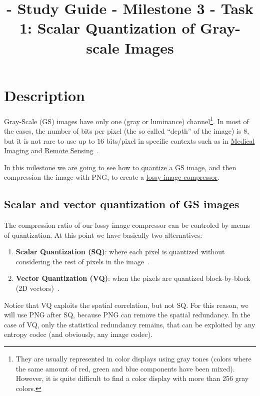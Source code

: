 

\title{\SM{} - Study Guide - Milestone 3 - Task 1: Scalar Quantization of Gray-scale Images}

\maketitle
\tableofcontents

\section{Description}

Gray-Scale (GS) images have only one (gray or luminance)
channel\footnote{They are usually represented in color displays using
gray tones (colors where the same amount of red, green and blue
components have been mixed). However, it is quite difficult to find a
color display with more than 256 gray colors.}. In most of the cases,
the number of bits per pixel (the so called ``depth'' of the image) is
$8$, but it is not rare to use up to $16$ bits/pixel in specific
contexts such as in
\href{https://en.wikipedia.org/wiki/Medical_imaging}{Medical Imaging}
and \href{https://en.wikipedia.org/wiki/Remote_sensing}{Remote
  Sensing}~\cite{burger2016digital}.

In this milestone we are going to see how to
\href{https://vicente-gonzalez-ruiz.github.io/quantization/}{quantize}
a GS image, and then compression the image with PNG, to create a
\href{https://en.wikipedia.org/wiki/Lossy_compression}{lossy image
  compressor}.

\subsection{Scalar and vector quantization of GS images}

The compression ratio of our lossy image compressor can be controled
by means of quantization. At this point we have basically two
alternatives:
\begin{enumerate}
\item \textbf{Scalar Quantization (SQ)}: where each pixel is quantized
  without considering the rest of pixels in the
  image~\cite{vruiz__scalar_quantization}.
\item \textbf{Vector Quantization (VQ)}: when the pixels are quantized
  block-by-block (2D vectors)~\cite{vruiz__vector_quantization}.
\end{enumerate}
Notice that VQ exploits the spatial correlation, but not SQ. For this
reason, we will use PNG after SQ, because PNG can remove the spatial
redundancy. In the case of VQ, only the statistical redundancy
remains, that can be exploited by any entropy codec (and obviously,
any image codec).

